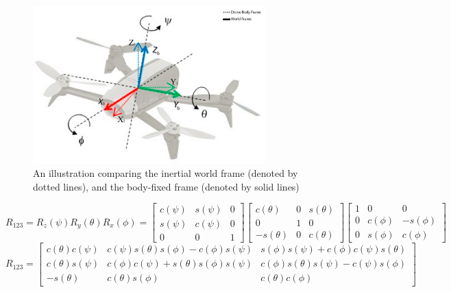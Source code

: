 \documentclass[letterpaper, paper,11pt]{AAS}	%
\begin{document}
\begin{figure}[htb]
	\centering\includegraphics[width=0.8\textwidth]{Figures/DroneFrame}
	\caption{An illustration comparing the inertial world frame (denoted by dotted lines), and the body-fixed frame (denoted by solid lines)}
	\label{fig:DroneFrame}
\end{figure}

\begin{equation}
\label{eq:R}
R_{123} = R_z(\psi)R_y(\theta)R_x(\phi) = \begin{bmatrix}
c(\psi) & s(\psi) & 0 \\
s(\psi) & c(\psi) & 0 \\
0 & 0 & 1
\end{bmatrix}
\begin{bmatrix}
c(\theta) & 0 & s(\theta) \\
0 & 1 & 0 \\
-s(\theta) & 0 & c(\theta)
\end{bmatrix}
\begin{bmatrix}
1&0&0\\
0&c(\phi)&-s(\phi)\\
0&s(\phi)&c(\phi)
\end{bmatrix}
\end{equation}
\begin{equation}
R_{123}
=
\begin{bmatrix}
c(\theta)c(\psi) & c(\psi)s(\theta)s(\phi) - c(\phi)s(\psi) & s(\phi)s(\psi) + c(\phi)c(\psi)s(\theta) \\
c(\theta)s(\psi) & c(\phi)c(\psi) + s(\theta)s(\phi)s(\psi) & c(\phi)s(\theta)s(\psi) - c(\psi)s(\phi) \\
-s(\theta) & c(\theta)s(\phi) & c(\theta)c(\phi) 
\end{bmatrix}
\end{equation}
\end{document}
